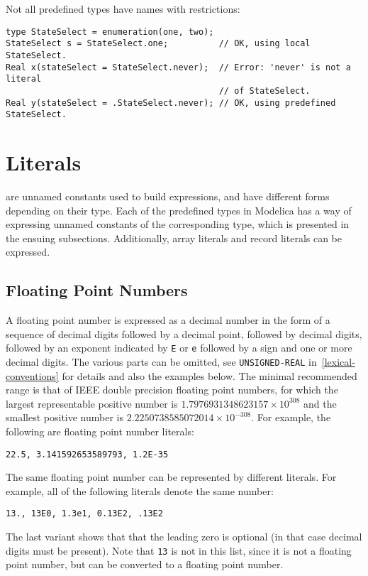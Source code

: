 \begin{example}
Not all predefined types have names with restrictions:
\begin{lstlisting}[language=modelica]
type StateSelect = enumeration(one, two);
StateSelect s = StateSelect.one;          // OK, using local StateSelect.
Real x(stateSelect = StateSelect.never);  // Error: 'never' is not a literal
                                          // of StateSelect.
Real y(stateSelect = .StateSelect.never); // OK, using predefined StateSelect.
\end{lstlisting}
\end{example}


\section{Literals}\label{literals}

 are unnamed constants used to build expressions, and have different forms depending on their type.
Each of the predefined types in Modelica has a way of expressing unnamed constants of the corresponding type, which is presented in the ensuing subsections.
Additionally, array literals and record literals can be expressed.


\subsection{Floating Point Numbers}\label{floating-point-numbers}

A floating point number is expressed as a decimal number in the form of a sequence of decimal digits followed by a decimal point, followed by decimal digits, followed by an exponent indicated by \lstinline!E! or \lstinline!e! followed by a sign and one or more decimal digits.
The various parts can be omitted, see \lstinline[language=grammar]!UNSIGNED-REAL! in~\cref{lexical-conventions} for details and also the examples below.
The minimal recommended range is that of IEEE double precision floating point numbers, for which the largest representable positive number is $1.7976931348623157\times10^{308}$ and the smallest positive number is $2.2250738585072014\times 10^{-308}$.
For example, the following are floating point number literals:
\begin{lstlisting}[language=modelica]
22.5, 3.141592653589793, 1.2E-35
\end{lstlisting}

The same floating point number can be represented by different literals.
For example, all of the following literals denote the same number:
\begin{lstlisting}[language=modelica]
13., 13E0, 1.3e1, 0.13E2, .13E2
\end{lstlisting}
The last variant shows that that the leading zero is optional (in that case decimal digits must be present).
Note that \lstinline!13! is not in this list, since it is not a floating point number, but can be converted to a floating point number.


